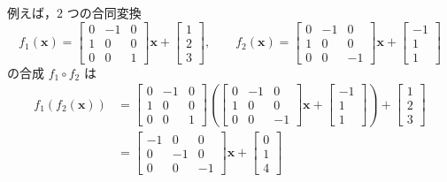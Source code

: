 \documentclass[11pt, uplatex, dvipdfmx, titlepage]{jsarticle}
\theoremstyle{definition}
\begin{document}
例えば，$2$ つの合同変換
\[
  f_1(\bm{x}) = \left[
    \begin{array}{rrr}
      0 & -1 & 0\\
      1 & 0 & 0\\
      0 & 0 & 1
    \end{array}
  \right] \bm{x} + \left[
    \begin{array}{r}
      1\\
      2\\
      3
    \end{array}
  \right], \qquad f_2(\bm{x}) = \left[
    \begin{array}{rrr}
      0 & -1 & 0\\
      1 & 0 & 0\\
      0 & 0 & -1
    \end{array}
  \right] \bm{x} + \left[
    \begin{array}{r}
      -1\\
      1\\
      1
    \end{array}
  \right]
\]
の合成 $f_1 \circ f_2$ は
\begin{align*}
  f_1( f_2(\bm{x})) &= \left[
    \begin{array}{rrr}
      0 & -1 &0\\
      1 & 0 & 0\\
      0 & 0 & 1
    \end{array}
  \right] \left( \left[
      \begin{array}{rrr}
        0 & -1 & 0\\
        1 & 0 & 0\\
        0 & 0 & -1
      \end{array}
    \right] \bm{x} + \left[
      \begin{array}{r}
        -1\\
        1\\
        1
      \end{array}
    \right] \right) + \left[
    \begin{array}{r}
      1\\
      2\\
      3
    \end{array}
  \right]\\
                    &= \left[
                      \begin{array}{rrr}
                        -1 & 0 & 0\\
                        0 & -1 & 0\\
                        0 & 0 & -1
                      \end{array}
                            \right] \bm{x} + \left[
                            \begin{array}{r}
                              0\\
                              1\\
                              4
                            \end{array}
  \right]
\end{align*}
\end{document}
